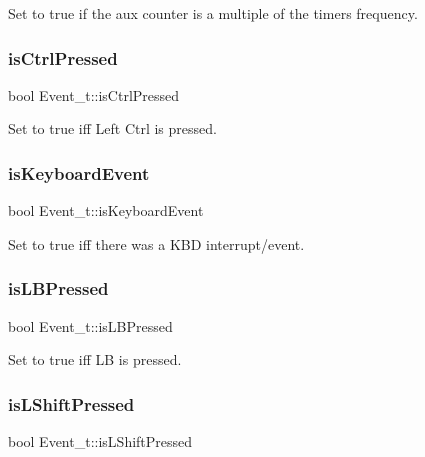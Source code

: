 Set to true if the aux counter is a multiple of the timer\textquotesingle{}s frequency. 

\mbox{\label{group__event_ga6889574ecb91bfdbfb6970744500343d}} 
\subsubsection{\texorpdfstring{is\+Ctrl\+Pressed}{isCtrlPressed}}
{\footnotesize\ttfamily bool Event\+\_\+t\+::is\+Ctrl\+Pressed}



Set to true iff Left Ctrl is pressed. 

\mbox{\label{group__event_ga7a5c0340c7ca96d9e3b888d9adeb7953}} 
\subsubsection{\texorpdfstring{is\+Keyboard\+Event}{isKeyboardEvent}}
{\footnotesize\ttfamily bool Event\+\_\+t\+::is\+Keyboard\+Event}



Set to true iff there was a K\+BD interrupt/event. 

\mbox{\label{group__event_ga6bd25b846a78fabf96eaa267cdead1a0}} 
\subsubsection{\texorpdfstring{is\+L\+B\+Pressed}{isLBPressed}}
{\footnotesize\ttfamily bool Event\+\_\+t\+::is\+L\+B\+Pressed}



Set to true iff LB is pressed. 

\mbox{\label{group__event_gad1fa4519784799da6a38747199ff898f}} 
\subsubsection{\texorpdfstring{is\+L\+Shift\+Pressed}{isLShiftPressed}}
{\footnotesize\ttfamily bool Event\+\_\+t\+::is\+L\+Shift\+Pressed}



